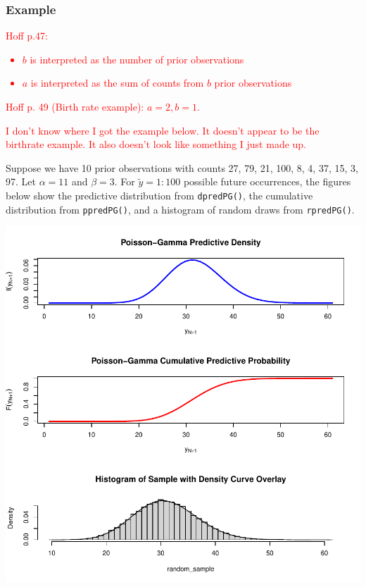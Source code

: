 \documentclass[12pt, a4paper]{article}
\begin{document}
    \subsubsection{Example}

\textcolor{red}{Hoff p.47:
  \begin{itemize}
    \item $b$ is interpreted as the number of prior observations
    \item $a$ is interpreted as the sum of counts from $b$ prior observations
  \end{itemize}
}

\textcolor{red}{  Hoff p. 49 (Birth rate example):  $a = 2, b = 1$. }

\textcolor{red}{I don't know where I got the example below.  It doesn't appear to be the birthrate example.  It also doesn't look like something I just made up.}

Suppose we have 10 prior observations with counts 27, 79, 21, 100, 8, 4, 37, 15, 3, 97.  Let $\alpha = 11$ and $\beta = 3$.  For $\tilde{y} = 1:100$ possible future occurrences, the figures below show the predictive distribution from \texttt{dpredPG()}, the cumulative distribution from \texttt{ppredPG()}, and a histogram of random draws from \texttt{rpredPG()}.

\includegraphics{Thesis_v3-005}
\end{document}
